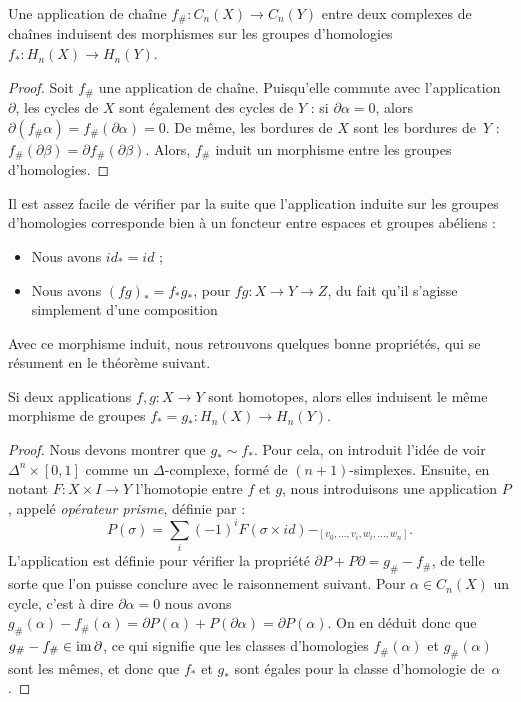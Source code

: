 \begin{proposition}
Une application de chaîne $f_\#:C_n(X)\to C_n(Y)$ entre deux complexes de chaînes induisent des morphismes sur les groupes d'homologies $f_\ast:H_n(X)\to H_n(Y)$.
\end{proposition}
\begin{proof}
Soit $f_\#$ une application de chaîne. Puisqu'elle commute avec l'application $\partial$, les cycles de $X$ sont également des cycles de $Y$ : si $\partial\alpha=0$, alors~$\partial (f_\#\alpha)=f_\#(\partial\alpha)=0$. De même, les bordures de $X$ sont les bordures de~$Y$ : $f_\#(\partial\beta)=\partial f_\#(\partial\beta)$. Alors, $f_\#$ induit un morphisme entre les groupes d'homologies.
\end{proof}

Il est assez facile de vérifier par la suite que l'application induite sur les groupes d'homologies corresponde bien à un foncteur entre espaces et groupes abéliens : \begin{itemize}
    \item Nous avons $id_\ast=id$ ;
    \item Nous avons $(fg)_\ast=f_\ast g_\ast$, pour $fg:X\to Y\to Z$, du fait qu'il s'agisse simplement d'une composition 
\end{itemize}

Avec ce morphisme induit, nous retrouvons quelques bonne propriétés, qui se résument en le théorème suivant.

\begin{theorem}
Si deux applications $f,g:X\to Y$ sont homotopes, alors elles induisent le même morphisme de groupes $f_\ast=g_\ast:H_n(X)\to H_n(Y)$.
\end{theorem}
\begin{proof}
Nous devons montrer que $g_\ast\sim f_\ast$. Pour cela, on introduit l'idée de voir $\Delta^n\times[0,1]$ comme un $\Delta$-complexe, formé de $(n+1)$-simplexes. Ensuite, en notant $F:X\times I\to Y$ l'homotopie entre $f$ et $g$, nous introduisons une application $P$, appelé \emph{opérateur prisme}, définie par : \[P(\sigma)=\sum_i (-1)^iF(\sigma\times i d)-_[v_0,...,v_i,w_i,...,w_n].\]L'application est définie pour vérifier la propriété $\partial P+P\partial = g_\#-f_\#$, de telle sorte que l'on puisse conclure avec le raisonnement suivant. Pour $\alpha\in C_n(X)$ un cycle, c'est à dire $\partial\alpha=0$ nous avons~${g_\#(\alpha)-f_\#(\alpha)=\partial P(\alpha)+P(\partial\alpha)=\partial P(\alpha)}$. On en déduit donc que~$g_\#-f_\#\in\mathrm{im}\,\partial$, ce qui signifie que les classes d'homologies $f_\#(\alpha)$ et $g_\#(\alpha)$ sont les mêmes, et donc que $f_\ast$ et $g_\ast$ sont égales pour la classe d'homologie de~$\alpha$.
\end{proof}


